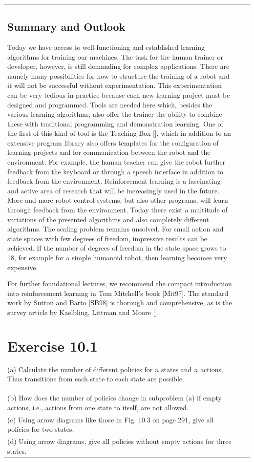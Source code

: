 \documentclass[10pt]{book}
\begin{document}
\begin{center}
\begin{tabular}{|l|l|l|}
\subsection{Summary and Outlook}
Today we have access to well-functioning and established learning algorithms for training our machines. The task for the human trainer or developer, however, is still demanding for complex applications. There are namely many possibilities for how to structure the training of a robot and it will not be successful without experimentation. This experimentation can be very tedious in practice because each new learning project must be designed and programmed. Tools are needed here which, besides the various learning algorithms, also offer the trainer the ability to combine these with traditional programming and demonstration learning. One of the first of this kind of tool is the Teaching-Box [\cite{esct09}], which in addition to an extensive program library also offers templates for the configuration of learning projects and for communication between the robot and the environment. For example, the human teacher can give the robot further feedback from the keyboard or through a speech interface in addition to feedback from the environment.
Reinforcement learning is a fascinating and active area of research that will be increasingly used in the future. More and more robot control systems, but also other programs, will learn through feedback from the environment. Today there exist a multitude of variations of the presented algorithms and also completely different algorithms. The scaling problem remains unsolved. For small action and state spaces with few degrees of freedom, impressive results can be achieved. If the number of degrees of freedom in the state space grows to 18, for example for a simple humanoid robot, then learning becomes very expensive.

For further foundational lectures, we recommend the compact introduction into reinforcement learning in Tom Mitchell's book [Mit97]. The standard work by Sutton and Barto [SB98] is thorough and comprehensive, as is the survey article by Kaelbling, Littman and Moore [\cite{klm96}].

\section{Exercise 10.1}
(a) Calculate the number of different policies for $n$ states and $n$ actions. Thus transitions from each state to each state are possible.\\
(b) How does the number of policies change in subproblem (a) if empty actions, i.e., actions from one state to itself, are not allowed.\\
(c) Using arrow diagrams like those in Fig. 10.3 on page 291, give all policies for two states.\\
(d) Using arrow diagrams, give all policies without empty actions for three states.


\end{tabular}
\end{center}
\end{document}
